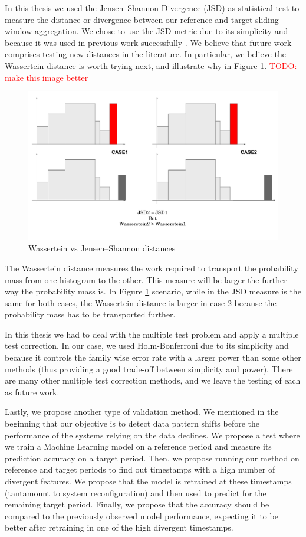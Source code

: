In this thesis we used the Jensen–Shannon Divergence (JSD) as statistical test to measure the distance or divergence between our reference and target sliding window aggregation. We chose to use the JSD metric due to its simplicity and because it was used in previous work successfully \cite{SAMM}. We believe that future work comprises testing new distances in the literature. In particular, we believe the Wassertein distance is worth trying next, and illustrate why in Figure \ref{fig:wasserteinvsjsd}.
\textcolor{red}{TODO: make this image better}
\begin{figure}[!htb]
    \begin{center}
      \includegraphics[scale=0.6]{figures/wasserstein-vs-jsd.pdf}
      \caption{Wassertein vs Jensen–Shannon distances}
      \label{fig:wasserteinvsjsd}
    \end{center}
\end{figure}
The Wassertein distance measures the work required to transport the probability mass from one histogram to the other. This measure will be larger the further way the probability mass is. In Figure \ref{fig:wasserteinvsjsd} scenario, while in the JSD measure is the same for both cases, the Wassertein distance is larger in case 2 because the probability mass has to be transported further.

In this thesis we had to deal with the multiple test problem and apply a multiple test correction. In our case, we used Holm-Bonferroni due to its simplicity and because it controls the family wise error rate with a larger power than some other methods (thus providing a good trade-off between simplicity and power). There are many other multiple test correction methods, and we leave the testing of each as future work.

Lastly, we propose another type of validation method. We mentioned in the beginning that our objective is to detect data pattern shifts before the performance of the systems relying on the data declines. We propose a test where we train a Machine Learning model on a reference period and measure its prediction accuracy on a target period. Then, we propose running our method on reference and target periods to find out timestamps with a high number of divergent features. We propose that the model is retrained at these timestamps (tantamount to system reconfiguration) and then used to predict for the remaining target period. Finally, we propose that the accuracy should be compared to the previously observed model performance, expecting it to be better after retraining in one of the high divergent timestamps.
